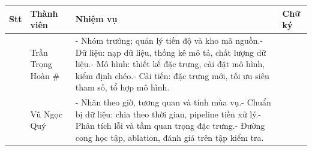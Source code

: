 \begingroup
{}
\noindent
\begin{tabularx}{\textwidth}{|>{\centering\arraybackslash}p{1.0cm}|>{\raggedright\arraybackslash}p{3.6cm}|>{\raggedright\arraybackslash}X|>{\centering\arraybackslash}p{2.2cm}|}
\hline
\textbf{Stt} & \centering\arraybackslash\textbf{Thành viên} & \centering\arraybackslash\textbf{Nhiệm vụ} & \textbf{Chữ ký} \\ \hline
1 & Trần Trọng Hoàn \# & - Nhóm trưởng; quản lý tiến độ và kho mã nguồn.\newline - Dữ liệu: nạp dữ liệu, thống kê mô tả, chất lượng dữ liệu.\newline - Mô hình: thiết kế đặc trưng, cài đặt mô hình, kiểm định chéo.\newline - Cải tiến: đặc trưng mới, tối ưu siêu tham số, tổ hợp mô hình. & \\[1.2cm] \hline
2 & Vũ Ngọc Quý & - Nhãn theo giờ, tương quan và tính mùa vụ.\newline - Chuẩn bị dữ liệu: chia theo thời gian, pipeline tiền xử lý.\newline - Phân tích lỗi và tầm quan trọng đặc trưng.\newline - Đường cong học tập, ablation, đánh giá trên tập kiểm tra. & \\[1.2cm] \hline
\end{tabularx}
\endgroup
